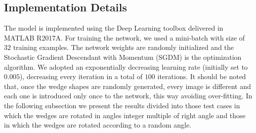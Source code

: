 \documentclass[conference,compsoc]{IEEEtran}
\begin{document}
\subsection{Implementation Details}
The model is implemented using the Deep Learning toolbox
delivered in MATLAB R2017A. For training the network, we used a mini-batch with size of $32$ training examples.
The network weights are randomly initialized and the Stochastic Gradient Descendant with
Momentum (SGDM) \cite{Ning} is the optimization algorithm.
We adopted an exponentially decreasing learning rate (initially
set to $0.005$), decreasing every iteration in a total of $100$ iterations.
It should be noted that, once the wedge shapes are randomly generated, every image is different
and each one is introduced only once to the network, this way avoiding over-fitting.
In the following subsection we present the results divided into those test cases in which the wedges are
rotated in angles integer multiple of right angle and those in which the wedges are rotated according
to a random angle.
\end{document}
